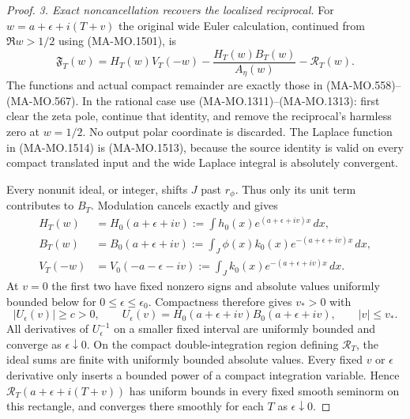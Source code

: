 \begin{proof}
\emph{3. Exact noncancellation recovers the localized reciprocal.}
For $w=a+\epsilon+i(T+v)$ the original wide Euler calculation,
continued from $\Re w>1/2$ using (MA-MO.1501), is
\[
 \mathfrak F_T(w)
    =H_T(w)V_T(-w)
           -\frac{H_T(w)B_T(w)}{A_\eta(w)}-\mathcal R_T(w).
\tag{MA-MO.1514}
\]
The functions and actual compact remainder are exactly those
in (MA-MO.558)--(MA-MO.567).  In the rational case use
(MA-MO.1311)--(MA-MO.1313): first clear the zeta pole,
continue that identity, and remove the reciprocal's harmless
zero at $w=1/2$.  No output polar coordinate is discarded.
The Laplace function in (MA-MO.1514) is (MA-MO.1513), because
the source identity is valid on every compact translated
input and the wide Laplace integral is absolutely convergent.

Every nonunit ideal, or integer, shifts $J$ past $r_\phi$.
Thus only its unit term contributes to $B_T$.  Modulation
cancels exactly and gives
\[
\begin{aligned}
 H_T(w)&=H_0(a+\epsilon+iv)
             :=\int h_0(x)e^{(a+\epsilon+iv)x}\,dx,\\
 B_T(w)&=B_0(a+\epsilon+iv)
             :=\int_J\phi(x)k_0(x)e^{-(a+\epsilon+iv)x}\,dx,\\
 V_T(-w)&=V_0(-a-\epsilon-iv)
             :=\int_Jk_0(x)e^{-(a+\epsilon+iv)x}\,dx.
\end{aligned}
\tag{MA-MO.1515}
\]
At $v=0$ the first two have fixed nonzero signs and absolute
values uniformly bounded below for $0\le\epsilon\le\epsilon_0$.
Compactness therefore gives $v_*>0$ with
\[
 |U_\epsilon(v)|\ge c>0,\qquad
 U_\epsilon(v)=H_0(a+\epsilon+iv)B_0(a+\epsilon+iv),
 \qquad |v|\le v_* .
\tag{MA-MO.1516}
\]
All derivatives of $U_\epsilon^{-1}$ on a smaller fixed
interval are uniformly bounded and converge as $\epsilon\downarrow0$.
On the compact double-integration region defining $\mathcal R_T$,
the ideal sums are finite with uniformly bounded absolute
values.  Every fixed $v$ or $\epsilon$ derivative only inserts
a bounded power of a compact integration variable.  Hence
$\mathcal R_T(a+\epsilon+i(T+v))$ has uniform bounds in every
fixed smooth seminorm on this rectangle, and converges there
smoothly for each $T$ as $\epsilon\downarrow0$.


\end{proof}
